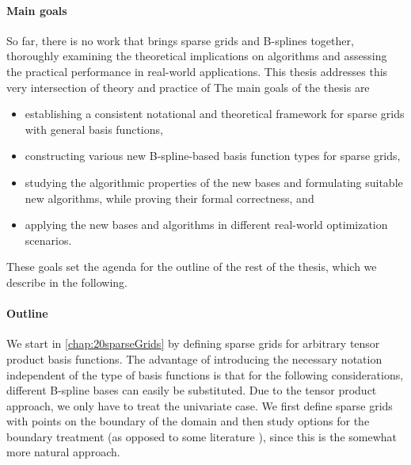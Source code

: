 \paragraph{Main goals}

So far, there is no work that brings sparse grids and B-splines together,
thoroughly examining the theoretical implications on algorithms and
assessing the practical performance in real-world applications.
This thesis addresses this very intersection of theory and practice of
The main goals of the thesis are
\begin{itemize}
  \item
  establishing a consistent notational and theoretical
  framework for sparse grids with general basis functions,
  
  \item
  constructing various new B-spline-based basis function types for
  sparse grids,
  
  \item
  studying the algorithmic properties of the new bases and
  formulating suitable new algorithms,
  while proving their formal correctness, and
  
  \item
  applying the new bases and algorithms in different real-world
  optimization scenarios.
\end{itemize}
These goals set the agenda for the outline of the rest of the thesis,
which we describe in the following.

\paragraph{Outline}

We start in \cref{chap:20sparseGrids} by defining sparse grids
for arbitrary tensor product basis functions.
The advantage of introducing the necessary notation independent
of the type of basis functions is that for the following
considerations, different B-spline bases can easily be substituted.
Due to the tensor product approach,
we only have to treat the univariate case.
We first define sparse grids with points on the boundary of the domain
and then study options for the boundary treatment
(as opposed to some literature %
),
since this is the somewhat more natural approach.

